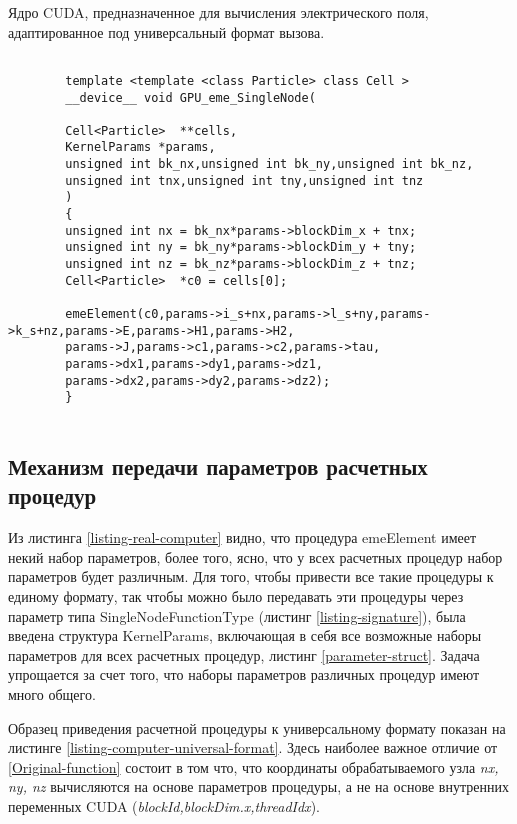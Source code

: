 \begin{ListingEnv}[!h]
	\captiondelim{ } %
	\caption{Ядро CUDA, предназначенное для вычисления электрического поля, адаптированное под универсальный формат вызова.}
	\label{parameter-struct1}	
	\begin{lstlisting}[language={[ISO]C++}]
	
		template <template <class Particle> class Cell >
		__device__ void GPU_eme_SingleNode(
		
		Cell<Particle>  **cells,
		KernelParams *params,
		unsigned int bk_nx,unsigned int bk_ny,unsigned int bk_nz,
		unsigned int tnx,unsigned int tny,unsigned int tnz
		)
		{
		unsigned int nx = bk_nx*params->blockDim_x + tnx;
		unsigned int ny = bk_ny*params->blockDim_y + tny;
		unsigned int nz = bk_nz*params->blockDim_z + tnz;
		Cell<Particle>  *c0 = cells[0];
		
		emeElement(c0,params->i_s+nx,params->l_s+ny,params->k_s+nz,params->E,params->H1,params->H2,
		params->J,params->c1,params->c2,params->tau,
		params->dx1,params->dy1,params->dz1,
		params->dx2,params->dy2,params->dz2);
		}
	
	\end{lstlisting}
	\label{listing-computer-universal-format}
\end{ListingEnv}

\subsection{Механизм передачи параметров расчетных процедур}


Из листинга \ref{listing-real-computer} видно, что процедура emeElement имеет некий набор параметров, более того, ясно, что у всех расчетных процедур набор параметров будет различным. Для
того, чтобы привести все такие процедуры к единому формату, так чтобы можно было передавать эти процедуры через параметр типа SingleNodeFunctionType (листинг \ref{listing-signature}), была введена структура KernelParams, включающая в себя все возможные наборы параметров для всех расчетных процедур, листинг \ref{parameter-struct}. Задача упрощается за счет того, что наборы параметров различных процедур имеют много общего. 

Образец приведения расчетной процедуры к универсальному формату показан на листинге \ref{listing-computer-universal-format}. Здесь наиболее важное отличие от \ref{Original-function} состоит в том что, что координаты обрабатываемого узла \textit{nx, ny, nz} вычисляются на основе параметров процедуры, а не на основе внутренних переменных CUDA (\textit{blockId,blockDim.x,threadIdx}).

